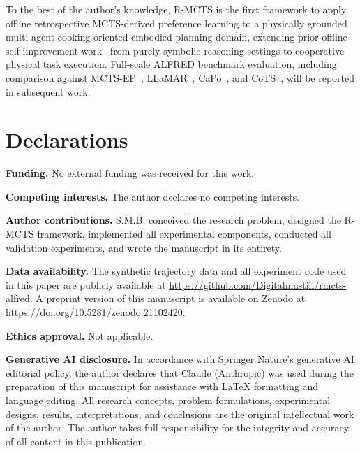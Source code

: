 \documentclass[pdflatex,sn-mathphys-num]{sn-jnl}
\theoremstyle{thmstyleone}
\theoremstyle{thmstyletwo}
\theoremstyle{thmstylethree}
\newcommand{\RMCTS}{\textsc{R-MCTS}}
\begin{document}
To the best of the author's knowledge, \RMCTS{} is the first framework
to apply offline retrospective MCTS-derived preference learning to a
physically grounded multi-agent cooking-oriented embodied planning
domain, extending prior offline self-improvement
work~\cite{ye2024alphallm,zhang2024rest} from purely symbolic reasoning
settings to cooperative physical task execution.
Full-scale ALFRED benchmark evaluation, including comparison against
MCTS-EP~\cite{xu2025mcts}, LLaMAR~\cite{nayak2024llamar},
CaPo~\cite{liu2025capo}, and CoTS~\cite{zu2025collaborative},
will be reported in subsequent work.

\backmatter

\section*{Declarations}

\textbf{Funding.}
No external funding was received for this work.

\textbf{Competing interests.}
The author declares no competing interests.

\textbf{Author contributions.}
S.M.B. conceived the research problem, designed the \RMCTS{} framework,
implemented all experimental components, conducted all validation
experiments, and wrote the manuscript in its entirety.

\textbf{Data availability.}
The synthetic trajectory data and all experiment code used in this paper
are publicly available at
\url{https://github.com/Digitalmustiii/rmcts-alfred}.
A preprint version of this manuscript is available on Zenodo at
\url{https://doi.org/10.5281/zenodo.21102420}.

\textbf{Ethics approval.}
Not applicable.

\textbf{Generative AI disclosure.}
In accordance with Springer Nature's generative AI editorial policy,
the author declares that Claude (Anthropic) was used during the
preparation of this manuscript for assistance with LaTeX formatting and
language editing.
All research concepts, problem formulations, experimental designs,
results, interpretations, and conclusions are the original intellectual
work of the author.
The author takes full responsibility for the integrity and accuracy of
all content in this publication.
\end{document}
